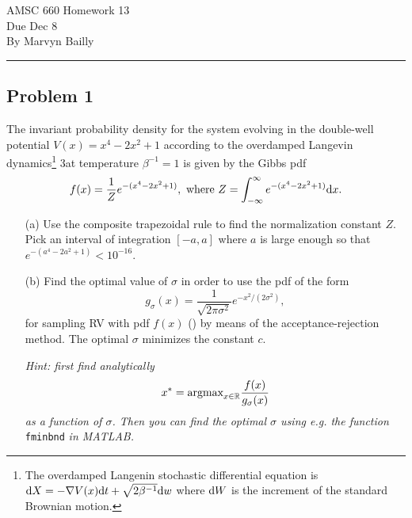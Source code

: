 \documentclass[12pt]{report}
\begin{document}
\large
\begin{center}
AMSC 660 Homework 13\\
Due Dec 8\\
By Marvyn Bailly\
\end{center}
\normalsize
\hrule



\begin{problem}%
\subsection*{Problem 1}

The invariant probability density for the system evolving in the double-well potential $V(x) = x^4 - 2x^2 + 1$ according to the overdamped Langevin dynamics\footnote{The overdamped Langenin stochastic differential equation is ${\mathrm{d}} X = -\nabla V(x) {\mathrm{d}} t + \sqrt{2\beta^{-1}}{\mathrm{d}} w$ where ${\mathrm{d}} W$ is the increment of the standard Brownian motion.} 3at temperature $\beta^{-1} = 1$ is given by the Gibbs pdf
\begin{equation} \label{p1}
    f(x) = \frac{1}{Z} e^{-(x^4 - 2x^2 + 1)}, ~\text{where}~ Z = \int_{-\infty}^\infty e^{-(x^4 - 2x^2 + 1)}{\mathrm{d}} x.
\end{equation}
\begin{enumerate}
    \item [(a)]
    Use the composite trapezoidal rule to find the normalization constant $Z$. Pick an interval of integration $[-a,a]$ where $a$ is large enough so that $e^{-(a^4 - 2a^2 + 1)} < 10^{-16}$.

    \item [(b)] Find the optimal value of $\sigma$ in order to use the pdf of the form
    \begin{equation*}
        g_\sigma (x) = \frac{1}{\sqrt{2 \pi \sigma^2}}e^{-x^2/(2\sigma^2)},
    \end{equation*}
    for sampling RV with pdf $f(x)$ () by means of the acceptance-rejection method. The optimal $\sigma$ minimizes the constant $c$. 

    \noindent
    \textit{Hint: first find analytically}
    \begin{equation*}
        x^* = \text{argmax}_{x \in {\mathbb R}} \frac{f(x)}{g_\sigma(x)}
    \end{equation*}
    \textit{as a function of $\sigma$. Then you can find the optimal $\sigma$ using e.g. the function} \verb+fminbnd+ \textit{in MATLAB.}


\end{enumerate}
\end{problem}
\end{document}

